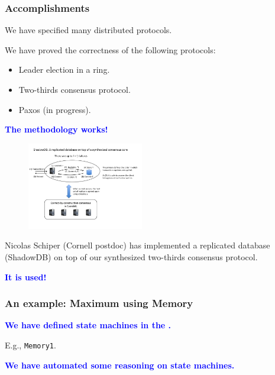 \documentclass[12pt,red]{beamer}
\newcommand{\cemph}[1]{\textcolor{blue}{\textbf{#1}}}
\begin{document}
\begin{frame}[fragile]
  \frametitle{Accomplishments}

  We have specified many distributed protocols.

  We have proved the correctness of the following protocols:
  \begin{itemize}
  \item Leader election in a ring.
  \item Two-thirds consensus protocol.
  \item Paxos (in progress).
  \end{itemize}

  \vspace{0.1in}

  \cemph{The methodology works!}

  \vspace{0.3in}

  \begin{figure}
    \vspace*{-0.5in}
    \begin{center}
      \includegraphics[width=2in]{Slide1}
    \end{center}
  \end{figure}
  Nicolas Schiper (Cornell postdoc) has implemented a replicated
  database (ShadowDB) on top of our synthesized two-thirds consensus
  protocol.


  \vspace{0.1in}
  \cemph{It is used!}
\end{frame}


\begin{frame}[fragile]
  \frametitle{An example: Maximum using Memory}

  \cemph{We have defined state machines in the \logicE.}

  \vspace{0.1in}

  E.g., \lstinline{Memory1}.

  \vspace{0.5in}

  \cemph{We have automated some reasoning on state machines.}

\end{frame}
\end{document}
